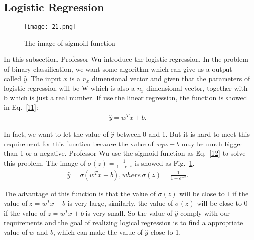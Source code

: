 \documentclass[a4paper]{article}
\begin{document}
\subsection{Logistic Regression}
\begin{figure}[h]
\begin{center}
  \texttt{[image: 21.png]}\\
  \caption{The image of sigmoid function}\label{2}
\end{center}
\end{figure}
In this subsection, Professor Wu introduce the logistic regression. In the problem of binary classification, we want some algorithm which can give us a output called $\hat{y}$. The input $x$ is a $n_x$ dimensional vector and given that the parameters of logistic regression will be W which is also a $n_x$ dimensional vector, together with b which is just a real number. If use the linear regression, the function is showed in Eq.~\ref{11}:
\begin{equation}\label{11}
\begin{split}
\hat{y}=w^Tx+b.
\end{split}
\end{equation}
\par 
In fact, we want to let the value of $\hat{y}$ between 0 and 1. But it is hard to meet this requirement for this function because the value of $w_Tx+b$ may be much bigger than 1 or a negative. Professor Wu use the sigmoid function as Eq.~\ref{12} to solve this problem. The image of $\sigma(z)=\frac{1}{1+e^{-z}}$ is showed as Fig.~\ref{2}. 
\begin{equation}\label{12}
\begin{split}
\hat{y}=\sigma(w^Tx+b),where~\sigma(z)=\frac{1}{1+e^{-z}}.
\end{split}
\end{equation}
\par 
The advantage of this function is that the value of $\sigma(z)$ will be close to 1 if the value of $z=w^Tx+b$ is very large, similarly, the value of $\sigma(z)$ will be close to 0 if the value of $z=w^Tx+b$ is very small. So the value of $\hat{y}$ comply with our requirements and the goal of realizing logical regression is to find a appropriate value of $w$ and $b$, which can make the value of $\hat{y}$ close to 1.
\end{document}
